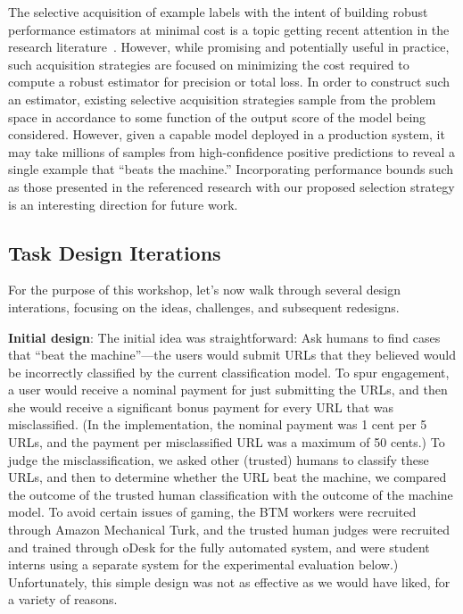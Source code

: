 The selective acquisition of example labels with the intent of building robust performance estimators at minimal cost is a topic getting recent attention in the research literature~\cite{activerisk2010,bennett:online}. However, while promising and potentially useful in practice, such acquisition strategies are focused on minimizing the cost required to compute a robust estimator for precision or total loss. In order to construct such an estimator, existing selective acquisition strategies sample from the problem space in accordance to some function of the output score of the model being considered. However, given a capable model deployed in a production system, it may take millions of samples from high-confidence positive predictions to reveal a single example that ``beats the machine.'' Incorporating performance bounds such as those presented in the referenced research with our proposed selection strategy is an interesting direction for future work. 

\subsection{Task Design Iterations}

For the purpose of this workshop, let's now walk through several design
interations, focusing on the ideas, challenges, and subsequent redesigns.

\textbf{Initial design}: The initial idea was straightforward: Ask humans to find cases that ``beat the machine''---the users would submit URLs that they believed would be incorrectly classified by the current classification model.  To spur engagement, a user would receive a nominal payment for just submitting the URLs, and then she would receive a significant bonus payment for every URL that was misclassified. (In the implementation, the nominal payment was 1 cent per 5 URLs, and the payment per misclassified URL was a maximum of 50 cents.)  To judge the misclassification, we asked other (trusted) humans to classify these URLs, and then to determine whether the URL beat the machine, we compared the outcome of the trusted human classification with the outcome of the machine model. To avoid certain issues of gaming, the BTM workers were recruited through Amazon Mechanical Turk, and the trusted human judges were recruited and trained through oDesk for the fully automated system, and were student interns using a separate system for the experimental evaluation below.)  Unfortunately, this simple design was not as effective as we would have liked, for a variety of reasons.

